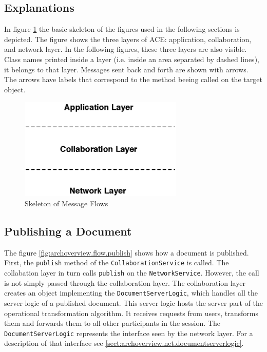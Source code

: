 \subsection{Explanations}
In figure \ref{fig:archoverview.flow.skeleton} the basic skeleton of the
figures used in the following sections is depicted. The figure shows the
three layers of ACE: application, collaboration, and network layer. In 
the following figures, these three layers are also visible. Class names
printed inside a layer (i.e. inside an area separated by dashed lines), it
belongs to that layer. Messages sent back and forth are shown with arrows. The
arrows have labels that correspond to the method beeing called on the target
object.

\begin{figure}[H]
 \centering
 \includegraphics[width=7.80cm,height=4.87cm]{../images/finalreport/architecture_flows/skeleton.eps}
 \caption{Skeleton of Message Flows}
 \label{fig:archoverview.flow.skeleton}
\end{figure}


\subsection{Publishing a Document}
The figure \ref{fig:archoverview.flow.publish} shows how a document 
is published.
First, the \texttt{publish} method of the \texttt{CollaborationService} is 
called. The collabation layer in turn calls \texttt{publish} on the
\texttt{NetworkService}. However, the call is not simply passed through the
collaboration layer. The collaboration layer creates an object implementing
the \texttt{DocumentServerLogic}, which handles all the server logic of a
published document. This server logic hosts the server part of the
operational transformation algorithm. It receives requests from users, 
transforms them and forwards them to all other participants in the session.
The \texttt{DocumentServerLogic} represents the interface seen by the
network layer. For a description of that interface see 
\ref{sect:archoverview.net.documentserverlogic}.

